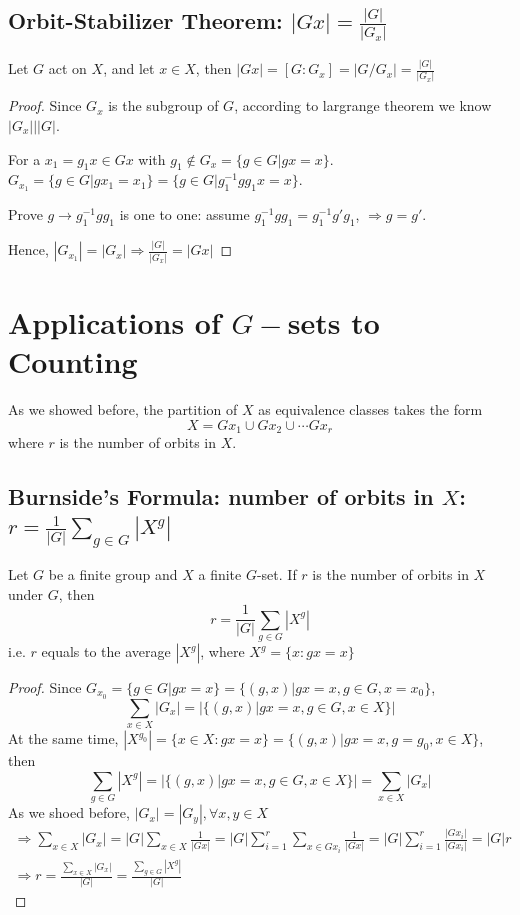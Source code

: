 \documentclass[11pt]{elegantbook}
\begin{document}
\subsection{Orbit-Stabilizer Theorem: $|Gx|=\frac{|G|}{|G_x|}$}
\begin{theorem}
    Let $G$ act on $X$, and let $x\in X$, then $|Gx|=[G:G_x]=|G/G_x|=\frac{|G|}{|G_x|}$
\end{theorem}
\begin{proof}
    Since $G_x$ is the subgroup of $G$, according to largrange theorem we know $|G_x|\bigg||G|$.

    For a $x_1=g_1x\in Gx$ with $g_1\notin G_x=\{g\in G\vert gx=x\}$. $G_{x_1}=\{g\in G\vert gx_1=x_1\}=\{g\in G\vert {g_1^{-1}gg_1}x=x\}$.
    
    Prove $g \rightarrow g_1^{-1}gg_1$ is one to one: assume $g_1^{-1}gg_1=g_1^{-1}g'g_1$, $\Rightarrow	g=g'$.
    
    Hence, $|G_{x_1}|=|G_x| \Rightarrow	\frac{|G|}{|G_x|}=|Gx|$
\end{proof}





\section{Applications of $G-$sets to Counting}
As we showed before, the partition of $X$ as equivalence classes takes the form $$X=Gx_1\cup Gx_2\cup \cdots Gx_r$$
where $r$ is the number of orbits in $X$.
\subsection{Burnside's Formula: number of orbits in $X$: $r=\frac{1}{|G|}\sum_{g\in G}|X^g|$}
\begin{theorem}
    Let $G$ be a finite group and $X$ a finite $G$-set. If $r$ is the number
    of orbits in $X$ under $G$, then $$r=\frac{1}{|G|}\sum_{g\in G}|X^g|$$ i.e. $r$ equals to the average $|X^g|$, where $X^g=\{x:gx=x\}$
\end{theorem}
\begin{proof}
    Since $G_{x_0}=\{g\in G\vert gx=x\}=\{(g,x)\vert gx=x,g\in G,x=x_0\}$,$$\sum_{x\in X}|G_x|=|\{(g,x)\vert gx=x,g\in G,x\in X\}|$$
    At the same time, $|X^{g_0}|=\{x\in X:gx=x\}=\{(g,x)\vert gx=x,g=g_0,x\in X\}$, then
    $$\sum_{g\in G}|X^g|=|\{(g,x)\vert gx=x,g\in G,x\in X\}|=\sum_{x\in X}|G_x|$$
    As we shoed before, $|G_{x}|=|G_{y}|,\forall x,y\in X$
    \begin{equation}
        \begin{aligned}
            \Rightarrow \sum_{x\in X}|G_x|=|G|\sum_{x\in X}\frac{1}{|Gx|}=|G|\sum_{i=1}^r\sum_{x\in Gx_i}\frac{1}{|Gx|}=|G|\sum_{i=1}^r\frac{|Gx_i|}{|Gx_i|}=|G|r\\
            \Rightarrow r=\frac{\sum_{x\in X}|G_x|}{|G|}=\frac{\sum_{g\in G}|X^g|}{|G|}
        \end{aligned}
        \nonumber
    \end{equation}
\end{proof}
\end{document}

